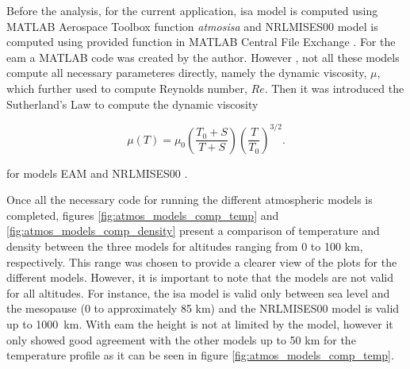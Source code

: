 Before the analysis, for the current application, \gls{isa} model is computed using MATLAB \cite{matlab_version_2024} Aerospace Toolbox \cite{noauthor_aerospace_nodate} function \textit{atmosisa} \cite{noauthor_atmosisa_nodate} and NRLMISES00 model is computed using provided function in MATLAB \cite{matlab_version_2024} Central File Exchange \cite{noauthor_atmosphere_2025}. For the \gls{eam} a MATLAB \cite{matlab_version_2024} code was created by the author. However , not all these models compute all necessary parameteres directly, namely the dynamic viscosity, $\mu$, which further used to compute Reynolds number, $Re$. Then it was introduced the Sutherland's Law to compute the dynamic viscosity

\begin{equation}
    \mu(T) = \mu_0 \left( \frac{T_0 + S}{T + S} \right) \left( \frac{T}{T_0} \right)^{3/2}.
\end{equation}

\noindent for models EAM \cite {noauthor_earth_nodate, noauthor_atmosisa_nodate} and NRLMISES00 \cite{picone_nrlmsise00_2002, noauthor_atmosphere_2025}.

Once all the necessary code for running the different atmospheric models is completed, figures \ref{fig:atmos_models_comp_temp} and \ref{fig:atmos_models_comp_density} present a comparison of temperature and density between the three models for altitudes ranging from 0 to 100 \unit{\km}, respectively. This range was chosen to provide a clearer view of the plots for the different models. However, it is important to note that the models are not valid for all altitudes. For instance, the \gls{isa} model is valid only between sea level and the mesopause (0 to approximately 85 \unit{\km}) and the NRLMISES00 model is valid up to 1000~\unit{\km}. With \gls{eam} the height is not at limited by the model, however it only showed good agreement with the other models up to 50 \unit{\km} for the temperature profile as it can be seen in figure \ref{fig:atmos_models_comp_temp}.


